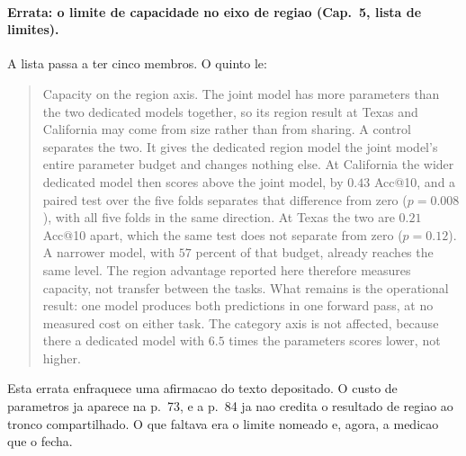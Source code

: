 %
%
%

\paragraph*{Errata: o limite de capacidade no eixo de regiao (Cap.~5, lista de limites).}
A lista passa a ter cinco membros. O quinto le:

\begin{quote}
Capacity on the region axis. The joint model has more parameters than the two dedicated models
together, so its region result at Texas and California may come from size rather than from sharing.
A control separates the two. It gives the dedicated region model the joint model's entire parameter
budget and changes nothing else. At California the wider dedicated model then scores above the
joint model, by $0.43$ Acc@10, and a paired test over the five folds separates that difference from
zero ($p = 0.008$), with all five folds in the same direction. At Texas the two are $0.21$ Acc@10
apart, which the same test does not separate from zero ($p = 0.12$). A narrower model, with $57$
percent of that budget, already reaches the same level. The region advantage reported here therefore
measures capacity, not transfer between the tasks. What remains is the operational result: one model
produces both predictions in one forward pass, at no measured cost on either task. The category axis
is not affected, because there a dedicated model with $6.5$ times the parameters scores lower, not
higher.
\end{quote}

\noindent
Esta errata enfraquece uma afirmacao do texto depositado. O custo de parametros ja aparece na
p.~73, e a p.~84 ja nao credita o resultado de regiao ao tronco compartilhado. O que faltava era o
limite nomeado e, agora, a medicao que o fecha.
